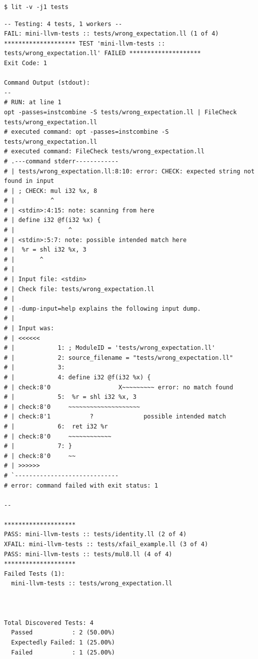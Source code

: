 \documentclass[10pt,a4paper,openany,oneside]{report}
\begin{document}
\begin{lstlisting}[style=shcmd]
$ lit -v -j1 tests
\end{lstlisting}
\begin{lstlisting}[style=out]
-- Testing: 4 tests, 1 workers --
FAIL: mini-llvm-tests :: tests/wrong_expectation.ll (1 of 4)
******************** TEST 'mini-llvm-tests :: tests/wrong_expectation.ll' FAILED ********************
Exit Code: 1

Command Output (stdout):
--
# RUN: at line 1
opt -passes=instcombine -S tests/wrong_expectation.ll | FileCheck tests/wrong_expectation.ll
# executed command: opt -passes=instcombine -S tests/wrong_expectation.ll
# executed command: FileCheck tests/wrong_expectation.ll
# .---command stderr------------
# | tests/wrong_expectation.ll:8:10: error: CHECK: expected string not found in input
# | ; CHECK: mul i32 %x, 8
# |          ^
# | <stdin>:4:15: note: scanning from here
# | define i32 @f(i32 %x) {
# |               ^
# | <stdin>:5:7: note: possible intended match here
# |  %r = shl i32 %x, 3
# |       ^
# | 
# | Input file: <stdin>
# | Check file: tests/wrong_expectation.ll
# | 
# | -dump-input=help explains the following input dump.
# | 
# | Input was:
# | <<<<<<
# |            1: ; ModuleID = 'tests/wrong_expectation.ll' 
# |            2: source_filename = "tests/wrong_expectation.ll" 
# |            3:  
# |            4: define i32 @f(i32 %x) { 
# | check:8'0                   X~~~~~~~~~ error: no match found
# |            5:  %r = shl i32 %x, 3 
# | check:8'0     ~~~~~~~~~~~~~~~~~~~~
# | check:8'1           ?              possible intended match
# |            6:  ret i32 %r 
# | check:8'0     ~~~~~~~~~~~~
# |            7: } 
# | check:8'0     ~~
# | >>>>>>
# `-----------------------------
# error: command failed with exit status: 1

--

********************
PASS: mini-llvm-tests :: tests/identity.ll (2 of 4)
XFAIL: mini-llvm-tests :: tests/xfail_example.ll (3 of 4)
PASS: mini-llvm-tests :: tests/mul8.ll (4 of 4)
********************
Failed Tests (1):
  mini-llvm-tests :: tests/wrong_expectation.ll



Total Discovered Tests: 4
  Passed           : 2 (50.00%)
  Expectedly Failed: 1 (25.00%)
  Failed           : 1 (25.00%)
\end{lstlisting}
\end{document}
